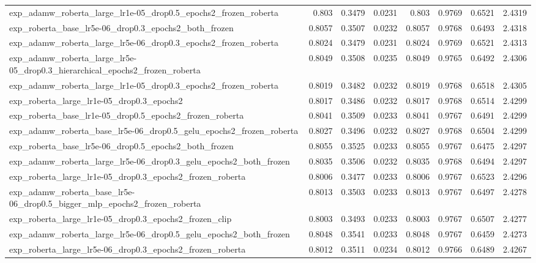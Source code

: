 \documentclass[a4paper,oneside,bibliography=totoc]{scrbook}
\begin{document}
\begin{landscape}
\begin{center}
\begin{longtable}{p{4cm} *{7}{r}}
        exp\_adamw\_roberta\_large\_lr1e-05\_drop0.5\_epochs2\_frozen\_roberta & 0.803 & 0.3479 & 0.0231 & 0.803 & 0.9769 & 0.6521 & 2.4319 \\ 
        exp\_roberta\_base\_lr5e-06\_drop0.3\_epochs2\_both\_frozen & 0.8057 & 0.3507 & 0.0232 & 0.8057 & 0.9768 & 0.6493 & 2.4318 \\ 
        exp\_adamw\_roberta\_large\_lr5e-06\_drop0.3\_epochs2\_frozen\_roberta & 0.8024 & 0.3479 & 0.0231 & 0.8024 & 0.9769 & 0.6521 & 2.4313 \\ 
        exp\_adamw\_roberta\_large\_lr5e-05\_drop0.3\_hierarchical\_epochs2\_frozen\_roberta & 0.8049 & 0.3508 & 0.0235 & 0.8049 & 0.9765 & 0.6492 & 2.4306 \\ 
        exp\_adamw\_roberta\_large\_lr1e-05\_drop0.3\_epochs2\_frozen\_roberta & 0.8019 & 0.3482 & 0.0232 & 0.8019 & 0.9768 & 0.6518 & 2.4305 \\ 
        exp\_roberta\_large\_lr1e-05\_drop0.3\_epochs2 & 0.8017 & 0.3486 & 0.0232 & 0.8017 & 0.9768 & 0.6514 & 2.4299 \\ 
        exp\_roberta\_base\_lr1e-05\_drop0.5\_epochs2\_frozen\_roberta & 0.8041 & 0.3509 & 0.0233 & 0.8041 & 0.9767 & 0.6491 & 2.4299 \\ 
        exp\_adamw\_roberta\_base\_lr5e-06\_drop0.5\_gelu\_epochs2\_frozen\_roberta & 0.8027 & 0.3496 & 0.0232 & 0.8027 & 0.9768 & 0.6504 & 2.4299 \\ 
        exp\_roberta\_base\_lr5e-06\_drop0.5\_epochs2\_both\_frozen & 0.8055 & 0.3525 & 0.0233 & 0.8055 & 0.9767 & 0.6475 & 2.4297 \\ 
        exp\_adamw\_roberta\_large\_lr5e-06\_drop0.3\_gelu\_epochs2\_both\_frozen & 0.8035 & 0.3506 & 0.0232 & 0.8035 & 0.9768 & 0.6494 & 2.4297 \\ 
        exp\_roberta\_large\_lr1e-05\_drop0.3\_epochs2\_frozen\_roberta & 0.8006 & 0.3477 & 0.0233 & 0.8006 & 0.9767 & 0.6523 & 2.4296 \\ 
        exp\_adamw\_roberta\_base\_lr5e-06\_drop0.5\_bigger\_mlp\_epochs2\_frozen\_roberta & 0.8013 & 0.3503 & 0.0233 & 0.8013 & 0.9767 & 0.6497 & 2.4278 \\ 
        exp\_roberta\_large\_lr1e-05\_drop0.3\_epochs2\_frozen\_clip & 0.8003 & 0.3493 & 0.0233 & 0.8003 & 0.9767 & 0.6507 & 2.4277 \\ 
        exp\_adamw\_roberta\_large\_lr5e-06\_drop0.5\_gelu\_epochs2\_both\_frozen & 0.8048 & 0.3541 & 0.0233 & 0.8048 & 0.9767 & 0.6459 & 2.4273 \\ 
        exp\_roberta\_large\_lr5e-06\_drop0.3\_epochs2\_frozen\_roberta & 0.8012 & 0.3511 & 0.0234 & 0.8012 & 0.9766 & 0.6489 & 2.4267 \\ 

\end{longtable}
\end{center}
\end{landscape}
\end{document}
